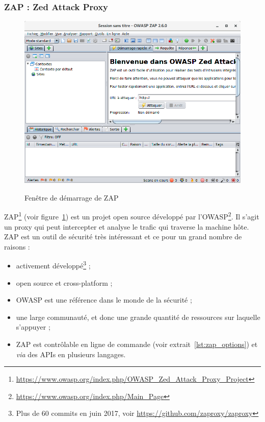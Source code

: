 \subsubsection{ZAP : Zed Attack Proxy}
\begin{figure}
  {\includegraphics[width=\textwidth]{images/zap_acceuil}}
  \centering
  \caption{Fenêtre de démarrage de ZAP}
  \label{fig:zap_acceuil}
\end{figure}
ZAP\footnote{\url{https://www.owasp.org/index.php/OWASP_Zed_Attack_Proxy_Project}} (voir figure~\ref{fig:zap_acceuil}) est un projet open source développé par l'OWASP\footnote{\url{https://www.owasp.org/index.php/Main_Page}}. Il s'agit un proxy qui peut intercepter et analyse le trafic qui traverse la machine hôte. ZAP est un outil de sécurité très intéressant et ce pour un grand nombre de raisons :
\begin{itemize}[label=$\bullet$]
\item activement développé\footnote{Plus de 60 commits en juin 2017, voir \url{https://github.com/zaproxy/zaproxy}} ;
\item open source et cross-platform ;
\item OWASP est une référence dans le monde de la sécurité ;
\item une large communauté, et donc une grande quantité de ressources sur laquelle s'appuyer ;
\item ZAP est contrôlable en ligne de commande (voir extrait~\ref{lst:zap_options}) et \textit{via} des APIs en plusieurs langages.
\end{itemize}

